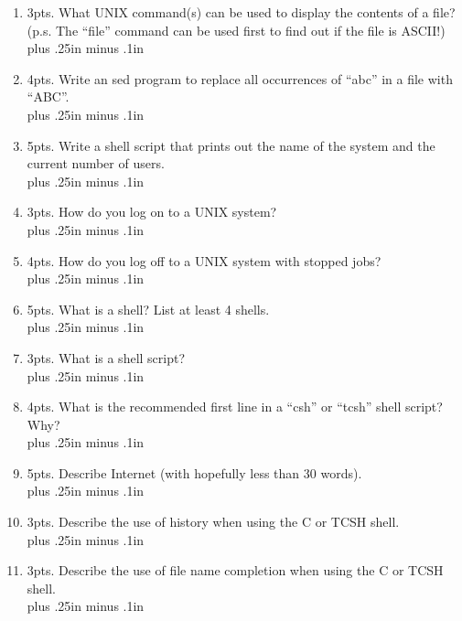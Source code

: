 \documentclass[12pt]{article}
\newcommand{\answerA}{\\ \vbox{\vskip 0.35in plus .25in minus .1in}}
\newcommand{\answerC}{\\ \vbox{\vskip 0.75in plus .25in minus .1in}}
\newcommand{\answerD}{\\ \vbox{\vskip 1.00in plus .25in minus .1in}}
\newcommand{\answerF}{\\ \vbox{\vskip 1.50in plus .25in minus .1in}}
\begin{document}
\begin{enumerate}
              system when you are finished using it?
\answerD
\item  3pts.  What UNIX command(s) can be used to display the 
              contents of a file?
              (p.s.  The ``file'' command can be used 
              first to find out if the file is ASCII!)
\answerC
\item  4pts.  Write an sed program to replace all occurrences of ``abc'' 
              in a file with
              ``ABC''.
\answerC
\item  5pts.  Write a shell script that prints out the name of the
              system and the current number of users.
\answerF
\item  3pts.  How do you log on to a UNIX system?
\answerA
\item  4pts.  How do you log off to a UNIX system with stopped jobs?
\answerA
\item  5pts.  What is a shell?  List at least 4 shells.
\answerC
\item  3pts.  What is a shell script?
\answerC
\item  4pts.  What is the recommended first line in a ``csh'' 
              or ``tcsh'' shell script?  Why?
\answerC
\item  5pts.  Describe Internet (with hopefully less than 30 words).
\answerD
\item  3pts.  Describe the use of history when using the C or TCSH shell.
\answerC
\item  3pts.  Describe the use of file name completion 
              when using the C or TCSH shell.
\answerC
\label{page:last}
\end{enumerate}
\end{document}
